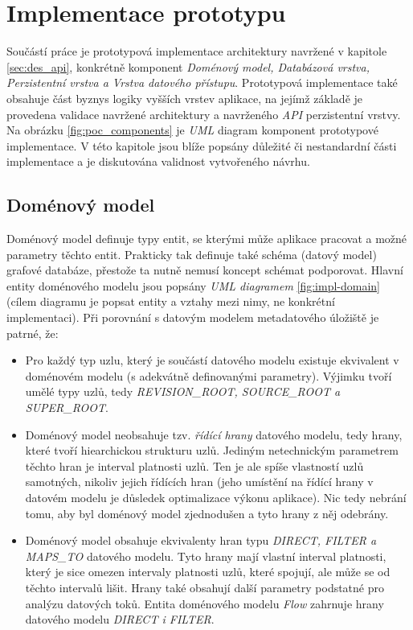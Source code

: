 \chapter{Implementace prototypu}
Součástí práce je prototypová implementace architektury navržené v kapitole \ref{sec:des_api}, konkrétně komponent \textit{Doménový model, Databázová vrstva, Perzistentní vrstva a Vrstva datového přístupu}. Prototypová implementace také obsahuje část byznys logiky vyšších vrstev aplikace, na jejímž základě je provedena validace navržené architektury a navrženého \textit{API} perzistentní vrstvy.  Na obrázku \ref{fig:poc_components} je \textit{UML} diagram komponent prototypové implementace. V této kapitole jsou blíže popsány důležité či nestandardní části implementace a je diskutována validnost vytvořeného návrhu.

\section{Doménový model}
Doménový model definuje typy entit, se kterými může aplikace pracovat a možné parametry těchto entit. Prakticky tak definuje také schéma (datový model) grafové databáze, přestože ta nutně nemusí koncept schémat podporovat. Hlavní entity doménového modelu jsou popsány \textit{ UML diagramem} \ref{fig:impl-domain} (cílem diagramu je popsat entity a vztahy mezi nimy, ne konkrétní implementaci). Při porovnání s datovým modelem metadatového úložiště je patrné, že:

\begin{itemize}
   \item Pro každý typ uzlu, který je součástí datového modelu existuje ekvivalent v doménovém modelu (s adekvátně definovanými parametry). Výjimku tvoří umělé typy uzlů, tedy \textit{REVISION\_ROOT, SOURCE\_ROOT a SUPER\_ROOT}.
   \item Doménový model neobsahuje tzv. \textit{řídící hrany} datového modelu, tedy hrany, které tvoří hiearchickou strukturu uzlů. Jediným netechnickým parametrem těchto hran je interval platnosti uzlů. Ten je ale spíše vlastností uzlů samotných, nikoliv jejich řídících hran (jeho umístění na řídící hrany v datovém modelu je důsledek optimalizace výkonu aplikace). Nic tedy nebrání tomu, aby byl doménový model zjednodušen a tyto hrany z něj odebrány.
   \item Doménový model obsahuje ekvivalenty hran typu \textit{DIRECT, FILTER a MAPS\_TO} datového modelu. Tyto hrany mají vlastní interval platnosti, který je sice omezen intervaly platnosti uzlů, které spojují, ale může se od těchto intervalů lišit. Hrany také obsahují další parametry podstatné pro analýzu datových toků. Entita doménového modelu \textit{Flow} zahrnuje hrany datového modelu \textit{DIRECT i FILTER}.
\end{itemize}


